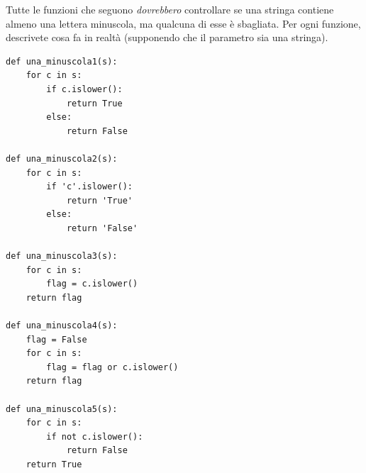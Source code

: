 \documentclass[10pt]{book}
\begin{document}
\vspace{0.2in}
\begin{exercise}

Tutte le funzioni che seguono {\em dovrebbero} controllare se una stringa contiene almeno una lettera minuscola, ma qualcuna di esse è sbagliata. Per ogni funzione, descrivete cosa fa in realtà (supponendo che il parametro sia una stringa).

\begin{verbatim}
def una_minuscola1(s):
    for c in s:
        if c.islower():
            return True
        else:
            return False

def una_minuscola2(s):
    for c in s:
        if 'c'.islower():
            return 'True'
        else:
            return 'False'

def una_minuscola3(s):
    for c in s:
        flag = c.islower()
    return flag

def una_minuscola4(s):
    flag = False
    for c in s:
        flag = flag or c.islower()
    return flag

def una_minuscola5(s):
    for c in s:
        if not c.islower():
            return False
    return True
\end{verbatim}

\end{exercise}
\end{document}
